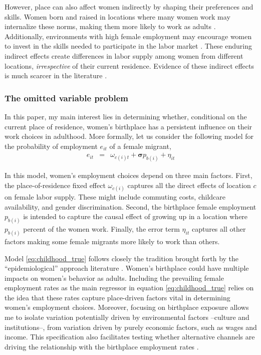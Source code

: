 However, place can also affect women indirectly by shaping their preferences and skills. Women born and raised in locations where many women work may internalize these norms, making them more likely to work as adults \citep{Charles2018, Boelmann}. Additionally, environments with high female employment may encourage women to invest in the skills needed to participate in the labor market \citep{Molina2022}. These enduring indirect effects create differences in labor supply among women from different locations, \textit{irrespective} of their current residence. Evidence of these indirect effects is much scarcer in the literature \citep{Charles2018}.




\subsubsection*{The omitted variable problem}
In this paper, my main interest lies in determining whether, conditional on the current place of residence, women's birthplace has a persistent influence on their work choices in adulthood. More formally, let us consider the following model for the probability of employment $e_{it}$ of a female migrant,
\begin{eqnarray}
	\label{eq:childhood_true}
	e_{it}&=&\omega_{c(i)t}+\boldsymbol\sigma p_{b(i)}+\eta_{it}
\end{eqnarray}

In this model, women's employment choices depend on three main factors. First, the place-of-residence fixed effect $\omega_{c(i)}$ captures all the direct effects of location $c$ on female labor supply. These might include commuting costs, childcare availability, and gender discrimination. Second, the birthplace female employment $p_{b(i)}$ is intended to capture the causal effect of growing up in a location where $p_{b(i)}$ percent of the women work. Finally, the error term $\eta_{it}$ captures all other factors making some female migrants more likely to work than others.

Model \eqref{eq:childhood_true} follows closely the tradition brought forth by the ``epidemiological'' approach literature \citep{Fernandeza,Fernandez2004,Fernandez2013}. Women's birthplace could have multiple impacts on women's behavior as adults. Including the prevailing female employment rates as the main regressor in equation \eqref{eq:childhood_true} relies on the idea that these rates capture place-driven factors vital in determining women's employment choices. Moreover, focusing on birthplace exposure allows me to isolate variation potentially driven by environmental factors --culture and institutions--, from variation driven by purely economic factors, such as wages and income. This specification also facilitates testing whether alternative channels are driving the relationship with the birthplace employment rates \citep{Fernandez2013}.

